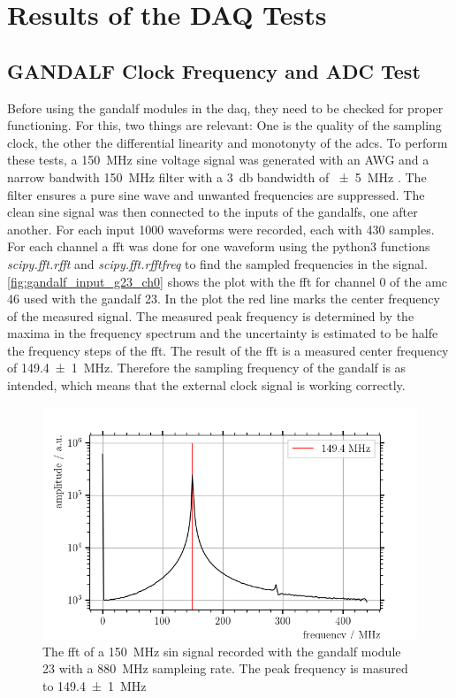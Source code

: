 \chapter{Results of the DAQ Tests}


\section{GANDALF Clock Frequency and ADC Test}
Before using the \ac{gandalf} modules in the \ac{daq}, they need to be checked for proper functioning.
For this, two things are relevant:
One is the quality of the sampling clock, the other the differential linearity and monotonyty of the \acp{adc}.
To perform these tests, a \SI{150}{\mega\hertz} sine voltage signal was generated with an AWG and a narrow bandwith \SI{150}{\mega\hertz} filter with a \SI{3}{\decibel} bandwidth of \SI{+-5}{\mega\hertz} \cite{Herrmann}.
The filter ensures a pure sine wave and unwanted frequencies are suppressed.
The clean sine signal was then connected to the inputs of the \acp{gandalf}, one after another.
For each input \num{1000} waveforms were recorded, each with 430 samples.
For each channel a \ac{fft} was done for one waveform using the python3 functions \textit{scipy.fft.rfft} and \textit{scipy.fft.rfftfreq} to find the sampled frequencies in the signal.
\autoref{fig:gandalf_input_g23_ch0} shows the plot with the \ac{fft} for channel 0 of the \ac{amc} 46 used with the \ac{gandalf} 23.
In the plot the red line marks the center frequency of the measured signal.
The measured peak frequency is determined by the maxima in the frequency spectrum and the uncertainty is estimated to be halfe the frequency steps of the \ac{fft}.
The result of the \ac{fft} is a measured center frequency of \SI{149.4(10)}{\mega\hertz}.
Therefore the sampling frequency of the \ac{gandalf} is as intended, which means that the external clock signal is working correctly.
\begin{figure}
	\centering
	\includegraphics[width=1.\textwidth]{pictures/gandalf_23_input_ch0}
	\caption[FFT of a \SI{150}{\mega\hertz} sin signal recorded with a GANDALF module.]{The \ac{fft} of a \SI{150}{\mega\hertz} sin signal recorded with the \ac{gandalf} module 23 with a \SI{880}{\mega\hertz} sampleing rate. The peak frequency is masured to \SI{149.4(10)}{\mega\hertz}}
	\label{fig:gandalf_input_g23_ch0}
\end{figure}


